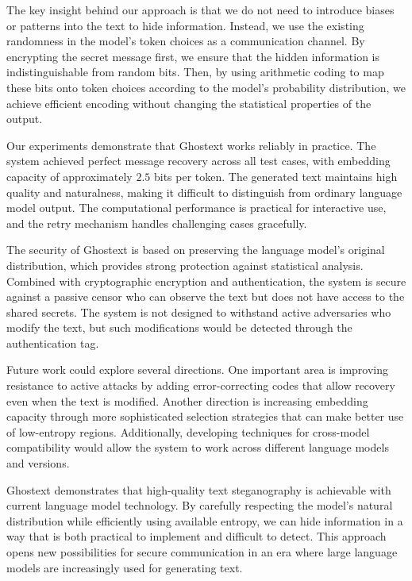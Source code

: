 \documentclass[sigconf,review,anonymous]{acmart}
\begin{document}
{The key insight behind our approach is that we do not need to introduce biases or patterns into the text to hide information. Instead, we use the existing randomness in the model's token choices as a communication channel. By encrypting the secret message first, we ensure that the hidden information is indistinguishable from random bits. Then, by using arithmetic coding to map these bits onto token choices according to the model's probability distribution, we achieve efficient encoding without changing the statistical properties of the output.

Our experiments demonstrate that Ghostext works reliably in practice. The system achieved perfect message recovery across all test cases, with embedding capacity of approximately $2.5$ bits per token. The generated text maintains high quality and naturalness, making it difficult to distinguish from ordinary language model output. The computational performance is practical for interactive use, and the retry mechanism handles challenging cases gracefully.

The security of Ghostext is based on preserving the language model's original distribution, which provides strong protection against statistical analysis. Combined with cryptographic encryption and authentication, the system is secure against a passive censor who can observe the text but does not have access to the shared secrets. The system is not designed to withstand active adversaries who modify the text, but such modifications would be detected through the authentication tag.

Future work could explore several directions. One important area is improving resistance to active attacks by adding error-correcting codes that allow recovery even when the text is modified. Another direction is increasing embedding capacity through more sophisticated selection strategies that can make better use of low-entropy regions. Additionally, developing techniques for cross-model compatibility would allow the system to work across different language models and versions.

Ghostext demonstrates that high-quality text steganography is achievable with current language model technology. By carefully respecting the model's natural distribution while efficiently using available entropy, we can hide information in a way that is both practical to implement and difficult to detect. This approach opens new possibilities for secure communication in an era where large language models are increasingly used for generating text.

}
\end{document}
